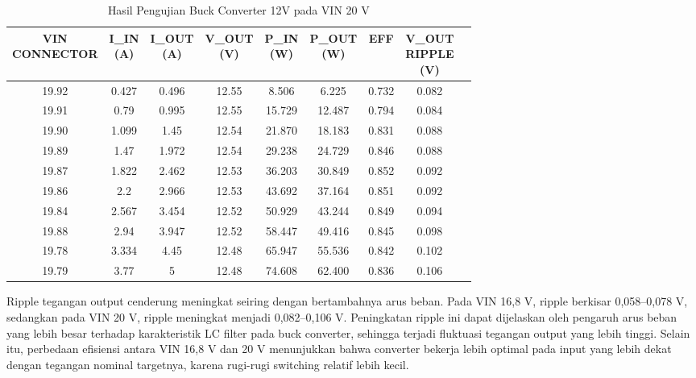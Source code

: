 \begin{table}[h!]
\centering
\caption{Hasil Pengujian Buck Converter 12V pada VIN 20 V}
\label{tab:buck12v_20v_no_vin}
\begin{tabular}{ccccccccc}
\hline
\makecell{VIN\\CONNECTOR} & \makecell{I\_IN\\(A)} & \makecell{I\_OUT\\(A)} & \makecell{V\_OUT\\(V)} & \makecell{P\_IN\\(W)} & \makecell{P\_OUT\\(W)} & EFF & \makecell{V\_OUT\\RIPPLE\\(V)} \\
\hline
19.92 & 0.427 & 0.496 & 12.55 & 8.506 & 6.225 & 0.732 & 0.082 \\
19.91 & 0.79 & 0.995 & 12.55 & 15.729 & 12.487 & 0.794 & 0.084 \\
19.90 & 1.099 & 1.45 & 12.54 & 21.870 & 18.183 & 0.831 & 0.088 \\
19.89 & 1.47 & 1.972 & 12.54 & 29.238 & 24.729 & 0.846 & 0.088 \\
19.87 & 1.822 & 2.462 & 12.53 & 36.203 & 30.849 & 0.852 & 0.092 \\
19.86 & 2.2 & 2.966 & 12.53 & 43.692 & 37.164 & 0.851 & 0.092 \\
19.84 & 2.567 & 3.454 & 12.52 & 50.929 & 43.244 & 0.849 & 0.094 \\
19.88 & 2.94 & 3.947 & 12.52 & 58.447 & 49.416 & 0.845 & 0.098 \\
19.78 & 3.334 & 4.45 & 12.48 & 65.947 & 55.536 & 0.842 & 0.102 \\
19.79 & 3.77 & 5 & 12.48 & 74.608 & 62.400 & 0.836 & 0.106 \\
\hline
\end{tabular}
\end{table}

Ripple tegangan output cenderung meningkat seiring dengan bertambahnya arus
beban. Pada VIN 16,8 V, ripple berkisar 0,058--0,078 V, sedangkan pada VIN 20 V,
ripple meningkat menjadi 0,082--0,106 V\@. Peningkatan ripple ini dapat
dijelaskan oleh pengaruh arus beban yang lebih besar terhadap karakteristik LC
filter pada buck converter, sehingga terjadi fluktuasi tegangan output yang
lebih tinggi. Selain itu, perbedaan efisiensi antara VIN 16,8 V dan 20 V
menunjukkan bahwa converter bekerja lebih optimal pada input yang lebih dekat
dengan tegangan nominal targetnya, karena rugi-rugi switching relatif lebih
kecil.

